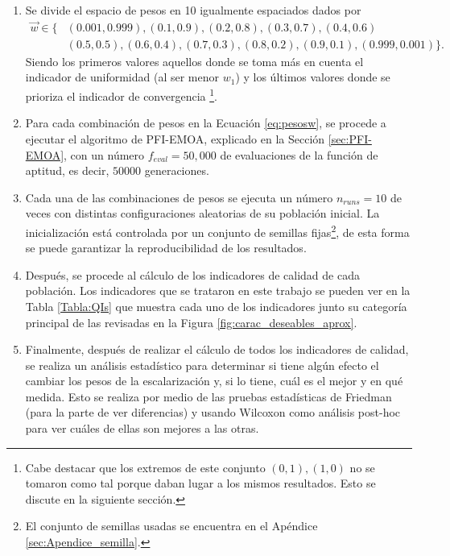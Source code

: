 \begin{enumerate}
    \item Se divide el espacio de pesos en 10 igualmente espaciados dados por 
    \begin{align} \label{eq:pesosw}
        \vec{w} \in \big\{ &(0.001,0.999),(0.1,0.9),(0.2,0.8),(0.3,0.7),(0.4,0.6) \nonumber\\
         &(0.5,0.5),(0.6,0.4),(0.7,0.3),(0.8,0.2),(0.9,0.1),(0.999,0.001) \big\}.
    \end{align}
    Siendo los primeros valores aquellos donde se toma más en cuenta el indicador de uniformidad (al ser menor $w_1$) y los últimos valores donde se prioriza el indicador de convergencia \footnote{Cabe destacar que los extremos de este conjunto $(0,1),(1,0)$ no se tomaron como tal porque daban lugar a los mismos resultados. Esto se discute en la siguiente sección.}.
    \item Para cada combinación de pesos en la Ecuación \ref{eq:pesosw}, se procede a ejecutar el algoritmo de PFI-EMOA, explicado en la Sección \ref{sec:PFI-EMOA}, con un número $f_{eval}=50,000$ de evaluaciones de la función de aptitud, es decir, $50000$  generaciones.
    \
    \item Cada una de las combinaciones de pesos se ejecuta un número $n_{runs}=10$ de veces con distintas configuraciones aleatorias de su población inicial. La inicialización está controlada por un conjunto de semillas fijas\footnote{El conjunto de semillas usadas se encuentra en el Apéndice \ref{sec:Apendice_semilla}.}, de esta forma se puede garantizar la reproducibilidad de los resultados.  

    \item Después, se procede al cálculo de los indicadores de calidad de cada población. Los indicadores que se trataron en este trabajo se pueden ver en la Tabla \ref{Tabla:QIs} que muestra cada uno de los indicadores junto su categoría principal de las revisadas en la Figura \ref{fig:carac_deseables_aprox}.
    \item Finalmente, después de realizar el cálculo de todos los indicadores de calidad, se realiza un análisis estadístico para determinar si tiene algún efecto el cambiar los pesos de la escalarización y, si lo tiene, cuál es el mejor y en qué medida. Esto se realiza por medio de las pruebas estadísticas de Friedman (para la parte de ver diferencias) y usando Wilcoxon como análisis post-hoc para ver cuáles de ellas son mejores a las otras.     
\end{enumerate}


